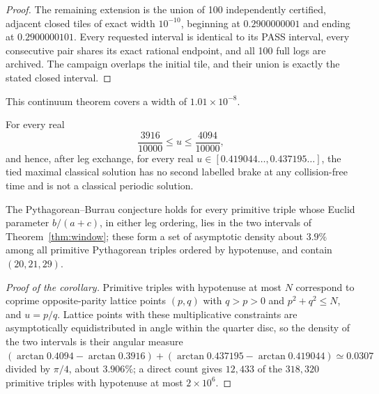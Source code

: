 \begin{proof}
The remaining extension is the union of 100 independently certified,
adjacent closed tiles of exact width $10^{-10}$, beginning at
$0.2900000001$ and ending at $0.2900000101$.  Every requested interval is
identical to its PASS interval, every consecutive pair shares its exact
rational endpoint, and all 100 full logs are archived. The campaign overlaps
the initial tile, and their union is exactly the stated closed interval.
\end{proof}

This continuum theorem covers a width of $1.01\times10^{-8}$.

\begin{theorem}\label{thm:window}
For every real
\[
 \frac{3916}{10000}\le u\le\frac{4094}{10000},
\]
and hence, after leg exchange, for every real $u\in[0.419044\ldots,0.437195\ldots]$,
the tied maximal classical solution has no second labelled brake at any
collision-free time and is not a classical periodic solution.
\end{theorem}

\begin{corollary}
The Pythagorean--Burrau conjecture holds for every primitive triple whose
Euclid parameter $b/(a+c)$, in either leg ordering, lies in the two intervals
of Theorem~\ref{thm:window}; these form a set of asymptotic density about
$3.9\%$ among all primitive Pythagorean triples ordered by hypotenuse, and
contain $(20,21,29)$.
\end{corollary}
\begin{proof}[Proof of the corollary]
Primitive triples with hypotenuse at most $N$ correspond to coprime
opposite-parity lattice points $(p,q)$ with $q>p>0$ and $p^2+q^2\le N$, and
$u=p/q$. Lattice points with these multiplicative constraints are
asymptotically equidistributed in angle within the quarter disc, so the
density of the two intervals is their angular measure
$(\arctan0.4094-\arctan0.3916)+(\arctan0.437195-\arctan0.419044)\simeq0.0307$
divided by $\pi/4$, about $3.906\%$; a direct count gives $12{,}433$ of the
$318{,}320$ primitive triples with hypotenuse at most $2\times10^6$.
\end{proof}

